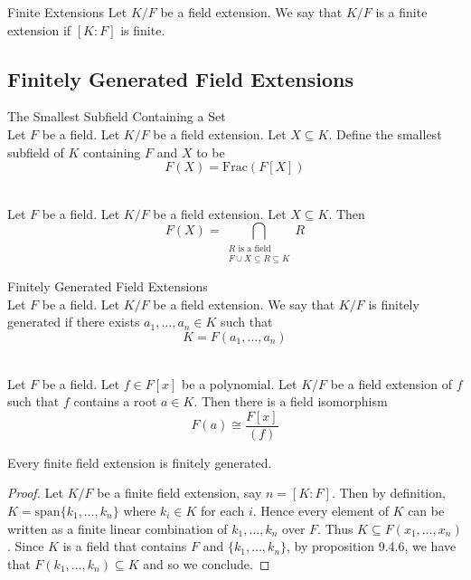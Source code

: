 \documentclass[a4paper]{article}
\begin{document}
\begin{defn}{Finite Extensions}{} Let $K/F$ be a field extension. We say that $K/F$ is a finite extension if $[K:F]$ is finite. 
\end{defn}

\subsection{Finitely Generated Field Extensions}
\begin{defn}{The Smallest Subfield Containing a Set}{}\\
Let $F$ be a field. Let $K/F$ be a field extension. Let $X\subseteq K$. Define the smallest subfield of $K$ containing $F$ and $X$ to be $$F(X)=\text{Frac}(F[X])$$
\end{defn}

\begin{prp}{}{}\\
Let $F$ be a field. Let $K/F$ be a field extension. Let $X\subseteq K$. Then $$F(X)=\bigcap_{\substack{R\text{ is a field}\\F\cup X\subseteq R\subseteq K}}R$$
\end{prp}

\begin{defn}{Finitely Generated Field Extensions}{}\\
Let $F$ be a field. Let $K/F$ be a field extension. We say that $K/F$ is finitely generated if there exists $a_1,\dots,a_n\in K$ such that $$K=F(a_1,\dots,a_n)$$
\end{defn}

\begin{prp}{}{}\\
Let $F$ be a field. Let $f\in F[x]$ be a polynomial. Let $K/F$ be a field extension of $f$ such that $f$ contains a root $a\in K$. Then there is a field isomorphism $$F(a)\cong\frac{F[x]}{(f)}$$
\end{prp}

\begin{prp}{}{} Every finite field extension is finitely generated. 
\begin{proof}
Let $K/F$ be a finite field extension, say $n=[K:F]$. Then by definition, $K=\text{span}\{k_1,\dots,k_n\}$ where $k_i\in K$ for each $i$. Hence every element of $K$ can be written as a finite linear combination of $k_1,\dots,k_n$ over $F$. Thus $K\subseteq F(x_1,\dots,x_n)$. Since $K$ is a field that contains $F$ and $\{k_1,\dots,k_n\}$, by proposition 9.4.6, we have that $F(k_1,\dots,k_n)\subseteq K$ and so we conclude. 
\end{proof}
\end{prp}
\end{document}
